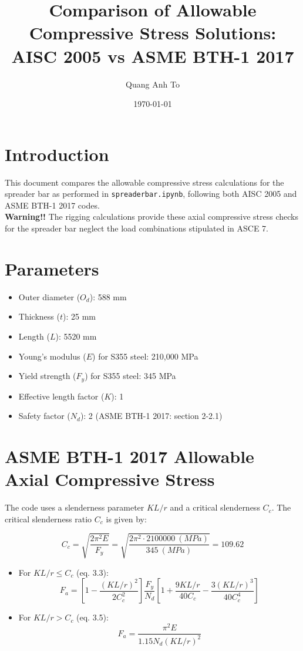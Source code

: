 \documentclass[12pt]{article}
\begin{document}
\title{Comparison of Allowable Compressive Stress Solutions: \\ AISC 2005 vs ASME BTH-1 2017}
\author{Quang Anh To}
\date{\today}
\maketitle

\section*{Introduction}
\noindent This document compares the allowable compressive stress calculations for the spreader bar as performed in \texttt{spreaderbar.ipynb}, following both AISC 2005 and ASME BTH-1 2017 codes. \\

\noindent \textbf{Warning!!} 
The rigging calculations provide these axial compressive stress checks for the spreader bar neglect the load combinations stipulated in ASCE 7.

\section*{Parameters}
\begin{itemize}
    \item Outer diameter ($O_d$): 588 mm
    \item Thickness ($t$): 25 mm
    \item Length ($L$): 5520 mm
    \item Young's modulus ($E$) for S355 steel: 210,000 MPa
    \item Yield strength ($F_y$) for S355 steel: 345 MPa
    \item Effective length factor ($K$): 1
    \item Safety factor ($N_d$): 2 (ASME BTH-1 2017: section 2-2.1)
\end{itemize}

\section*{ASME BTH-1 2017 Allowable Axial Compressive Stress}
The code uses a slenderness parameter $KL/r$ and a critical slenderness $C_c$.
The critical slenderness ratio $C_c$ is given by:

\[
    C_c = \sqrt{\frac{2\pi^2 E}{F_y}} = \sqrt{\frac{2\pi^2 \cdot 2100000 \ (MPa)}{345 \ (MPa)}} = 109.62
\]

\begin{itemize}
    \item For $KL/r \leq C_c$ (eq. 3.3):
    \begin{equation*}
        F_a = \left[1 - \frac{(KL/r)^2}{2C_c^2}\right] \frac{F_y}{N_d} \left[1 + \frac{9 KL/r}{40 C_c} - \frac{3 (KL/r)^3}{40 C_c^4}\right] 
    \end{equation*}
    \item For $KL/r > C_c$ (eq. 3.5):
    \begin{equation*}
        F_a = \frac{\pi^2 E}{1.15 N_d (KL/r)^2} 
    \end{equation*}
\end{itemize}
\end{document}
